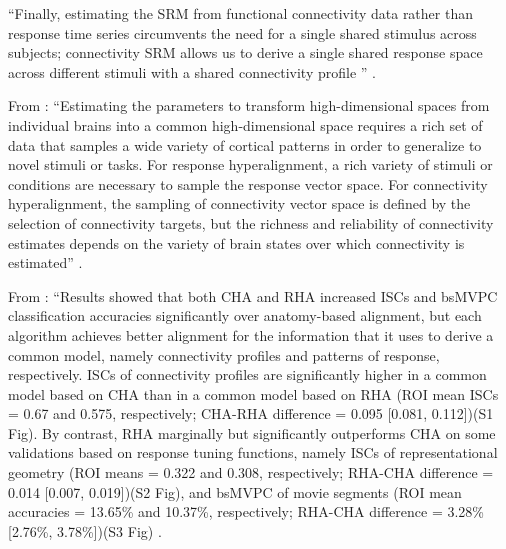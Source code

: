 ``Finally, estimating the SRM from functional connectivity data rather than
response time series circumvents the need for a single shared stimulus across
subjects; connectivity SRM allows us to derive a single shared response space
across different stimuli with a shared connectivity profile
\citep{nastase2019leveraging}'' \citep{kumar2020brainiak}.


From \citet{haxby2020hyperalignment}: ``Estimating the parameters to transform
high-dimensional spaces from individual brains into a common high-dimensional
space requires a rich set of data that samples a wide variety of cortical
patterns in order to generalize to novel stimuli or tasks.
%
For response hyperalignment, a rich variety of stimuli or conditions are
necessary to sample the response vector space.
%
For connectivity hyperalignment, the sampling of connectivity vector space is
defined by the selection of connectivity targets, but the richness and
reliability of connectivity estimates depends on the variety of brain states
over which connectivity is estimated'' \citep{haxby2020hyperalignment}.

%
From \citet{guntupalli2018computational}: ``Results showed that both CHA and RHA
increased ISCs and bsMVPC classification accuracies significantly over
anatomy-based alignment, but each algorithm achieves better alignment for the
information that it uses to derive a common model, namely connectivity profiles
and patterns of response, respectively.
%
ISCs of connectivity profiles are
significantly higher in a common model based on CHA than in a common model based
on RHA (ROI mean ISCs = 0.67 and 0.575, respectively; CHA-RHA difference = 0.095
[0.081, 0.112])(S1 Fig).
%
By contrast, RHA marginally but significantly
outperforms CHA on some validations based on response tuning functions, namely
ISCs of representational geometry (ROI means = 0.322 and 0.308, respectively;
RHA-CHA difference = 0.014 [0.007, 0.019])(S2 Fig), and bsMVPC of movie segments
(ROI mean accuracies = 13.65\% and 10.37\%, respectively; RHA-CHA difference =
3.28\% [2.76\%, 3.78\%])(S3 Fig) \citep{guntupalli2018computational}.

